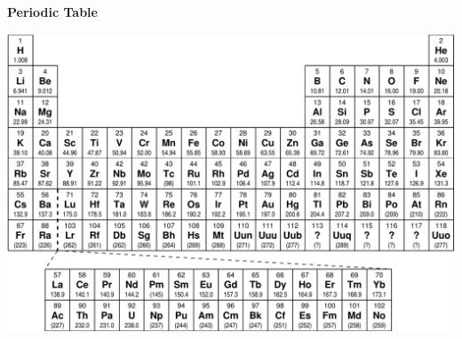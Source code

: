 \documentclass[12pt]{article}
\begin{document}
\pagestyle{empty}
\setlength{\baselineskip}{0.1in}

\begin{center}
\Large
\textbf{ Periodic Table}
\end{center}
\bigskip

\includegraphics[height=0.8\textwidth,angle=90]{periodic_table}


\newpage
\phantom{...}
\vfill


\end{document}
